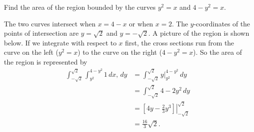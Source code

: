 \begin{activity} \label{A:11.4.2} Find the area of the region bounded by the curves $y^2 = x$ and $4-y^2=x$.

\end{activity}
\begin{smallhint}

\end{smallhint}
\begin{bighint}

\end{bighint}
\begin{activitySolution}
The two curves intersect when $x = 4-x$ or when $x=2$. The $y$-coordinates of the points of intersection are $y = \sqrt{2}$ and $y = -\sqrt{2}$. A picture of the region is shown below. If we integrate with respect to $x$ first, the cross sections run from the curve on the left ($y^2=x$) to the curve on the right ($4-y^2=x$). So the area of the region is represented by 
\begin{align*}
\int_{-\sqrt{2}}^{\sqrt{2}} \int_{y^2}^{4-y^2} 1 \, dx, \, dy &= \int_{-\sqrt{2}}^{\sqrt{2}} \left. y \right|_{y^2}^{4-y^2}  \, dy \\
	&= \int_{-\sqrt{2}}^{\sqrt{2}} 4-2y^2  \, dy \\
	&= \left. \left[ 4y - \frac{2}{3}y^3 \right] \right|_{-\sqrt{2}}^{\sqrt{2}} \\
	&= \frac{16}{3} \sqrt{2}.
\end{align*}
\end{activitySolution}
\aftera
